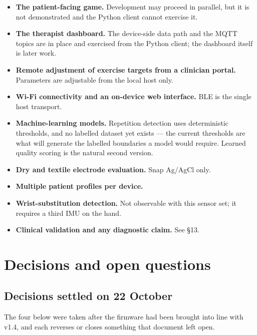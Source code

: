 \documentclass[11pt]{article}
\begin{document}
\begin{plainbox}
\begin{itemize}
\item \textbf{The patient-facing game.} Development may proceed in parallel, but
it is not demonstrated and the Python client cannot exercise it.
\item \textbf{The therapist dashboard.} The device-side data path and the MQTT
topics are in place and exercised from the Python client; the dashboard itself
is later work.
\item \textbf{Remote adjustment of exercise targets from a clinician portal.}
Parameters are adjustable from the local host only.
\item \textbf{Wi-Fi connectivity and an on-device web interface.} BLE is the
single host transport.
\item \textbf{Machine-learning models.} Repetition detection uses deterministic
thresholds, and no labelled dataset yet exists --- the current thresholds are
what will generate the labelled boundaries a model would require. Learned
quality scoring is the natural second version.
\item \textbf{Dry and textile electrode evaluation.} Snap Ag/AgCl only.
\item \textbf{Multiple patient profiles per device.}
\item \textbf{Wrist-substitution detection.} Not observable with this sensor set;
it requires a third IMU on the hand.
\item \textbf{Clinical validation and any diagnostic claim.} See \S13.
\end{itemize}
\end{plainbox}

\clearpage
\section{Decisions and open questions}

\subsection{Decisions settled on 22 October}

\noindent
The four below were taken after the firmware had been brought into line with
v1.4, and each reverses or closes something that document left open.
\end{document}
